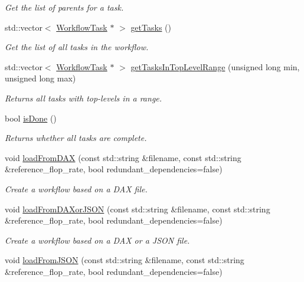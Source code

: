 \begin{DoxyCompactItemize}
\begin{DoxyCompactList}\small\item\em Get the list of parents for a task. \end{DoxyCompactList}\item 
std\+::vector$<$ \hyperlink{classwrench_1_1_workflow_task}{Workflow\+Task} $\ast$ $>$ \hyperlink{classwrench_1_1_workflow_abc742b44f0895ae2a42e60c63621f8aa}{get\+Tasks} ()
\begin{DoxyCompactList}\small\item\em Get the list of all tasks in the workflow. \end{DoxyCompactList}\item 
std\+::vector$<$ \hyperlink{classwrench_1_1_workflow_task}{Workflow\+Task} $\ast$ $>$ \hyperlink{classwrench_1_1_workflow_a7d8044bd686157c24b89c53810cb2b1b}{get\+Tasks\+In\+Top\+Level\+Range} (unsigned long min, unsigned long max)
\begin{DoxyCompactList}\small\item\em Returns all tasks with top-\/levels in a range. \end{DoxyCompactList}\item 
bool \hyperlink{classwrench_1_1_workflow_afc59b67119511acac649652d560f238a}{is\+Done} ()
\begin{DoxyCompactList}\small\item\em Returns whether all tasks are complete. \end{DoxyCompactList}\item 
void \hyperlink{classwrench_1_1_workflow_ac7048676d96d85a4f59580d4f77da935}{load\+From\+D\+AX} (const std\+::string \&filename, const std\+::string \&reference\+\_\+flop\+\_\+rate, bool redundant\+\_\+dependencies=false)
\begin{DoxyCompactList}\small\item\em Create a workflow based on a D\+AX file. \end{DoxyCompactList}\item 
void \hyperlink{classwrench_1_1_workflow_aac13e09401af73a566695502b559dda0}{load\+From\+D\+A\+Xor\+J\+S\+ON} (const std\+::string \&filename, const std\+::string \&reference\+\_\+flop\+\_\+rate, bool redundant\+\_\+dependencies=false)
\begin{DoxyCompactList}\small\item\em Create a workflow based on a D\+AX or a J\+S\+ON file. \end{DoxyCompactList}\item 
void \hyperlink{classwrench_1_1_workflow_aa0b24ef757bfaf6cffcd61256331a33d}{load\+From\+J\+S\+ON} (const std\+::string \&filename, const std\+::string \&reference\+\_\+flop\+\_\+rate, bool redundant\+\_\+dependencies=false)

\end{DoxyCompactItemize}
